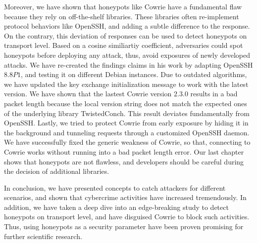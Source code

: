 Moreover, we have shown that honeypots like Cowrie have a fundamental flaw because they rely on off-the-shelf libraries.
These libraries often re-implement protocol behaviors like OpenSSH, and adding a subtle difference to the response.
On the contrary, this deviation of responses can be used to detect honeypots on transport level.
Based on a cosine similiartiy coefficient, adversaries could spot honeypots before deploying any attack, thus, avoid exposures of newly developed attacks.
We have re-created the findings \citet{vetterl2020} claims in his work by adapting OpenSSH $8.8P1$, and testing it on different Debian instances.
Due to outdated algorithms, we have updated the key exchange initialization message to work with the latest version.
We have shown that the lastest Cowrie version $2.3.0$ results in a bad packet length because the local version string does not match the expected ones of the underlying library TwistedConch.
This result deviates fundamentally from OpenSSH.
Lastly, we tried to protect Cowrie from early exposure by hiding it in the background and tunneling requests through a customized OpenSSH daemon.
We have successfully fixed the generic weakness of Cowrie, so that, connecting to Cowrie works without running into a bad packet length error.
Our last chapter shows that honeypots are not flawless, and developers should be careful during the decision of additional libraries.

In conclusion, we have presented concepts to catch attackers for different scenarios, and shown that cybercrime activities have increased tremendously.
In addition, we have taken a deep dive into an edge-breaking study to detect honeypots on transport level, and have disguised Cowrie to block such activities.
Thus, using honeypots as a security parameter have been proven promising for further scientific research.
